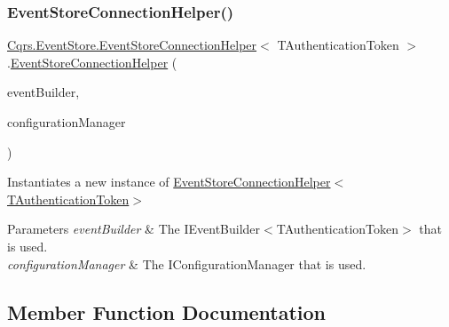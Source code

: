 \subsubsection{\texorpdfstring{Event\+Store\+Connection\+Helper()}{EventStoreConnectionHelper()}}
{\footnotesize\ttfamily \hyperlink{classCqrs_1_1EventStore_1_1EventStoreConnectionHelper}{Cqrs.\+Event\+Store.\+Event\+Store\+Connection\+Helper}$<$ T\+Authentication\+Token $>$.\hyperlink{classCqrs_1_1EventStore_1_1EventStoreConnectionHelper}{Event\+Store\+Connection\+Helper} (\begin{DoxyParamCaption}\item[{\hyperlink{interfaceCqrs_1_1EventStore_1_1IEventBuilder}{I\+Event\+Builder}$<$ T\+Authentication\+Token $>$}]{event\+Builder,  }\item[{\hyperlink{interfaceCqrs_1_1Configuration_1_1IConfigurationManager}{I\+Configuration\+Manager}}]{configuration\+Manager }\end{DoxyParamCaption})}



Instantiates a new instance of \hyperlink{classCqrs_1_1EventStore_1_1EventStoreConnectionHelper_ac9d232e255275c70aee4465b08e7fd79_ac9d232e255275c70aee4465b08e7fd79}{Event\+Store\+Connection\+Helper$<$\+T\+Authentication\+Token$>$} 


\begin{DoxyParams}{Parameters}
{\em event\+Builder} & The I\+Event\+Builder$<$\+T\+Authentication\+Token$>$ that is used.\\
\hline
{\em configuration\+Manager} & The I\+Configuration\+Manager that is used.\\
\hline
\end{DoxyParams}


\subsection{Member Function Documentation}
\mbox{\label{classCqrs_1_1EventStore_1_1EventStoreConnectionHelper_af2520736a2fb83c8b4b03e3581980c75_af2520736a2fb83c8b4b03e3581980c75}} 
